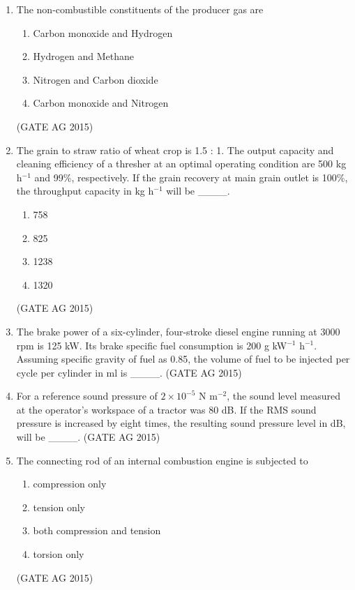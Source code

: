 \documentclass[journal,12pt,onecolumn]{IEEEtran}
\theoremstyle{remark}
\begin{document}
\begin{enumerate}
\item 
The non-combustible constituents of the producer gas are
\begin{multicols}{2}
\begin{enumerate}
    \item Carbon monoxide and Hydrogen
    \item Hydrogen and Methane
    \item Nitrogen and Carbon dioxide
    \item Carbon monoxide and Nitrogen
\end{enumerate}
\end{multicols}
\hfill{(GATE AG 2015)}

\item 
The grain to straw ratio of wheat crop is 1.5 : 1. The output capacity and cleaning efficiency of a thresher at an optimal operating condition are 500 kg h$^{-1}$ and 99\%, respectively. If the grain recovery at main grain outlet is 100\%, the throughput capacity in kg h$^{-1}$ will be \_\_\_\_.
\begin{multicols}{4}
\begin{enumerate}
    \item 758
    \item 825
    \item 1238
    \item 1320
\end{enumerate}
\end{multicols}
\hfill{(GATE AG 2015)}

\item 
The brake power of a six-cylinder, four-stroke diesel engine running at 3000 rpm is 125 kW. Its brake specific fuel consumption is 200 g kW$^{-1}$ h$^{-1}$. Assuming specific gravity of fuel as 0.85, the volume of fuel to be injected per cycle per cylinder in ml is \_\_\_\_.
\hfill{(GATE AG 2015)}

\item 
For a reference sound pressure of $2 \times 10^{-5}$ N m$^{-2}$, the sound level measured at the operator's workspace of a tractor was 80 dB. If the RMS sound pressure is increased by eight times, the resulting sound pressure level in dB, will be \_\_\_\_.
\hfill{(GATE AG 2015)}

\item 
The connecting rod of an internal combustion engine is subjected to
\begin{multicols}{2}
\begin{enumerate}
    \item compression only
    \item tension only
    \item both compression and tension
    \item torsion only
\end{enumerate}
\end{multicols}
\hfill{(GATE AG 2015)}


\end{enumerate}
\end{document}
